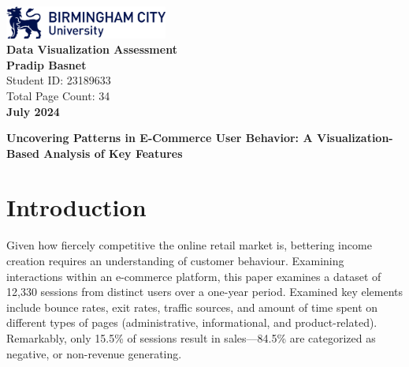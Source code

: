 \documentclass[12pt]{article}
\begin{document}
\begin{titlepage}
    \centering
    \includegraphics[width=0.4\textwidth]{bcu-logo.png} \\[1cm] %
    
    {\LARGE \textbf{Data Visualization Assessment}} \\[1cm]
    
    \textbf{Pradip Basnet} \\
    Student ID: 23189633 \\[0.5cm]
    
    Total Page Count: 34 \\[1cm]
    
    \textbf{July 2024}
    
\end{titlepage}




\newpage %
\tableofcontents %
\newpage
\listoffigures %

\newpage 



\newpage 
\begin{center}

    \LARGE \textbf{Uncovering Patterns in E-Commerce User Behavior: A Visualization-Based Analysis of Key Features}
\end{center}

\section{Introduction}

Given how fiercely competitive the online retail market is, bettering income creation requires an understanding of customer behaviour. Examining interactions within an e-commerce platform, this paper examines a dataset of 12,330 sessions from distinct users over a one-year period. Examined key elements include bounce rates, exit rates, traffic sources, and amount of time spent on different types of pages (administrative, informational, and product-related). Remarkably, only 15.5\% of sessions result in sales—84.5\% are categorized as negative, or non-revenue generating.
\end{document}
